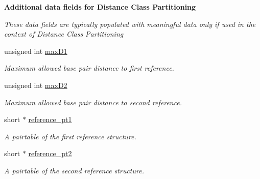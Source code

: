\begin{Indent}\textbf{ Additional data fields for Distance Class Partitioning}\par
{\em These data fields are typically populated with meaningful data only if used in the context of Distance Class Partitioning }\begin{DoxyCompactItemize}
\item 
\mbox{\label{group__fold__compound_a426305721b16023f2f3247f7354d2c46}} 
unsigned int \hyperlink{group__fold__compound_a426305721b16023f2f3247f7354d2c46}{max\+D1}
\begin{DoxyCompactList}\small\item\em Maximum allowed base pair distance to first reference. \end{DoxyCompactList}\item 
\mbox{\label{group__fold__compound_a38695774fd396c892f9a70d39978b231}} 
unsigned int \hyperlink{group__fold__compound_a38695774fd396c892f9a70d39978b231}{max\+D2}
\begin{DoxyCompactList}\small\item\em Maximum allowed base pair distance to second reference. \end{DoxyCompactList}\item 
\mbox{\label{group__fold__compound_aa279ba4bd0ff541d435d3a049687f3ac}} 
short $\ast$ \hyperlink{group__fold__compound_aa279ba4bd0ff541d435d3a049687f3ac}{reference\+\_\+pt1}
\begin{DoxyCompactList}\small\item\em A pairtable of the first reference structure. \end{DoxyCompactList}\item 
\mbox{\label{group__fold__compound_a926ad253f5f0eed642bc227493d0278d}} 
short $\ast$ \hyperlink{group__fold__compound_a926ad253f5f0eed642bc227493d0278d}{reference\+\_\+pt2}
\begin{DoxyCompactList}\small\item\em A pairtable of the second reference structure. \end{DoxyCompactList}\item 
\mbox{\label{group__fold__compound_a62a8d4ab8dadffbf09da917adff6c71e}} 

\end{DoxyCompactItemize}
\end{Indent}
